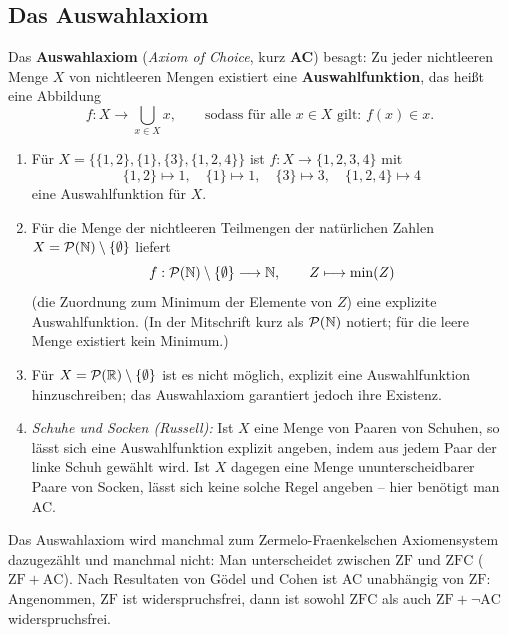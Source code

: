 \subsection{Das Auswahlaxiom}

\begin{definition}[Auswahlaxiom (AC)]
Das \textbf{Auswahlaxiom} (\emph{Axiom of Choice}, kurz \textbf{AC}) besagt:
Zu jeder nichtleeren Menge $X$ von nichtleeren Mengen existiert eine
\textbf{Auswahlfunktion}, das heißt eine Abbildung
\[
    f:X\longrightarrow\bigcup_{x\in X}x,
    \qquad\text{sodass für alle }x\in X\text{ gilt: }f(x)\in x.
\]
\end{definition}

\begin{beispiel}[Auswahlfunktionen]
\begin{enumerate}
    \item Für $X=\{\{1,2\},\{1\},\{3\},\{1,2,4\}\}$ ist
    $f:X\to\{1,2,3,4\}$ mit
    \[
        \{1,2\}\mapsto1,\quad
        \{1\}\mapsto1,\quad
        \{3\}\mapsto3,\quad
        \{1,2,4\}\mapsto4
    \]
    eine Auswahlfunktion für $X$.
    \item Für die Menge der nichtleeren Teilmengen der natürlichen Zahlen
    $X=\mathcal{P}(\mathbb{N})\setminus\{\emptyset\}$ liefert
    \[
        f:\mathcal{P}(\mathbb{N})\setminus\{\emptyset\}\longrightarrow\mathbb{N},\qquad
        Z\longmapsto\min(Z)
    \]
    (die Zuordnung zum Minimum der Elemente von $Z$) eine explizite
    Auswahlfunktion. (In der Mitschrift kurz als $\mathcal{P}(\mathbb{N})$ notiert;
    für die leere Menge existiert kein Minimum.)
    \item Für $X=\mathcal{P}(\mathbb{R})\setminus\{\emptyset\}$ ist es nicht möglich,
    explizit eine Auswahlfunktion hinzuschreiben; das Auswahlaxiom
    garantiert jedoch ihre Existenz.
    \item \emph{Schuhe und Socken (Russell):} Ist $X$ eine Menge von
    Paaren von Schuhen, so lässt sich eine Auswahlfunktion explizit
    angeben, indem aus jedem Paar der linke Schuh gewählt wird.
    Ist $X$ dagegen eine Menge ununterscheidbarer Paare von Socken,
    lässt sich keine solche Regel angeben -- hier benötigt man AC.
\end{enumerate}
\end{beispiel}

\begin{bemerkung}
Das Auswahlaxiom wird manchmal zum Zermelo-Fraenkelschen Axiomensystem
dazugezählt und manchmal nicht: Man unterscheidet zwischen $\mathrm{ZF}$
und $\mathrm{ZFC}$ ($\mathrm{ZF}+\mathrm{AC}$).
Nach Resultaten von Gödel und Cohen ist AC unabhängig von $\mathrm{ZF}$:
Angenommen, $\mathrm{ZF}$ ist widerspruchsfrei, dann ist sowohl
$\mathrm{ZFC}$ als auch $\mathrm{ZF}+\neg\mathrm{AC}$ widerspruchsfrei.
\end{bemerkung}

